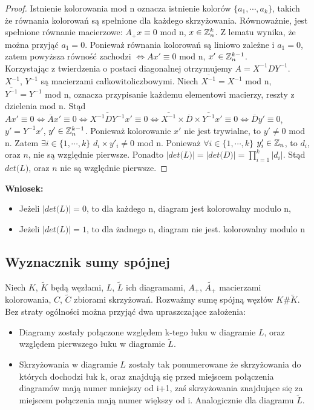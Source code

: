 \begin{proof}
Istnienie kolorowania mod n oznacza istnienie kolorów $\lbrace a_{1}, \cdots, a_{k} \rbrace$, takich że równania kolorowań są spełnione dla każdego skrzyżowania. Równoważnie, jest spełnione równanie macierzowe: $ A_{+}x \equiv 0$ mod n, $x \in \mathbb Z^k_{n}$. Z lematu wynika, że można przyjąć $a_{1} = 0 $. Ponieważ równania kolorowań są liniowo zależne i $a_{1} = 0 $, zatem powyższa równość zachodzi $\Leftrightarrow Ax' \equiv 0$ mod n, $x' \in \mathbb Z^{k-1}_{n}$. \\
Korzystając z twierdzenia o postaci diagonalnej otrzymujemy $A = X^{-1} D Y^{-1}$. \\ $X^{-1}$, $Y^{-1}$ są macierzami całkowitoliczbowymi. Niech $\overline{X^{-1}} = X^{-1}$ mod n, $\overline{Y^{-1}} = Y^{-1}$ mod n, oznacza przypisanie każdemu elementowi macierzy, reszty z dzielenia mod n. Stąd $Ax' \equiv 0 \Leftrightarrow \overline{A}x' \equiv 0 \Leftrightarrow \overline{X^{-1} D Y^{-1}}x' \equiv 0 \Leftrightarrow \overline{X^{-1}} \times \overline{D} \times \overline{Y^{-1}}x' \equiv 0 \Leftrightarrow \overline{D} y' \equiv 0$, $y' =Y^{-1}x'$, $y' \in \mathbb Z^{k-1}_{n}$. Ponieważ kolorowanie $x'$ nie jest trywialne, to $y' \neq 0$ mod n. Zatem $\exists i \in \lbrace 1, \cdots, k \rbrace$  $d_{i} \times y'_{i} \neq 0$ mod n. Ponieważ $\forall i \in \lbrace 1, \cdots, k \rbrace$  $y'_{i} \in \mathbb Z_{n}$, to $d_{i}$, oraz $n$, nie są względnie pierwsze. Ponadto $\vert det \big(L \big) \vert =\vert det \big(D \big) \vert= \prod^k_{i=1} \vert d_{i}\vert$. Stąd $det \big(L \big)$, oraz $n$ nie są względnie pierwsze.
\end{proof}
\textbf{Wniosek:} 
\begin{itemize}
\item Jeżeli $\vert det \big(L \big) \vert = 0$, to dla każdego n, diagram jest kolorowalny modulo n,
\item Jeżeli $\vert det \big(L \big) \vert = 1$, to dla żadnego n, diagram nie jest. kolorowalny modulo n
\end{itemize}


\subsection{Wyznacznik sumy spójnej} 
Niech $K$, $\tilde{K}$ będą węzłami, $L$, $\tilde{L}$ ich diagramami, $A_{+}$, $\tilde{A_{+}}$ macierzami kolorowania, $C$, $\tilde{C}$ zbiorami skrzyżowań. Rozważmy sumę spójną węzłów $K\#\tilde{K}$. Bez straty ogólności można przyjąć dwa upraszczające założenia:
\begin{itemize}
\item Diagramy zostały połączone względem k-tego łuku w diagramie $L$, oraz względem pierwszego łuku w diagramie $\tilde{L}$.  
\item Skrzyżowania w diagramie $L$ zostały tak ponumerowane że skrzyżowania do których dochodzi łuk k, oraz znajdują się przed miejscem połączenia diagramów mają numer mniejszy od i+1, zaś skrzyżowania znajdujące się za miejscem połączenia mają numer większy od i. Analogicznie dla diagramu $\tilde{L}$. 
\end{itemize} 

